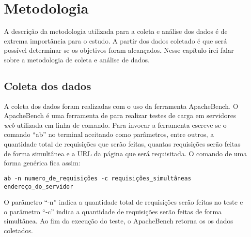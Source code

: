 \chapter{Metodologia}\label{cap:metodologia}
A descrição da metodologia utilizada para a coleta e análise dos dados é de 
extrema importância para o estudo. A partir dos dados coletado é que será 
possível determinar se os objetivos foram alcançados. Nesse capítulo irei falar 
sobre a metodologia de coleta e análise de dados.\\

\section{Coleta dos dados}
A coleta dos dados foram realizadas com o uso da ferramenta ApacheBench. O 
ApacheBench é uma ferramenta de para realizar testes de carga em servidores 
\textit{web} utilizada em linha de comando. Para invocar a ferramenta 
escreve-se o comando ``ab'' no terminal aceitando como parâmetros, entre 
outros, a quantidade total de requisições que serão feitas, quantas requisições 
serão feitas de forma simultânea e a URL da página que será requisitada. O 
comando de uma forma genérica fica assim:
\begin{verbatim}
ab -n numero_de_requisições -c requisições_simultâneas endereço_do_servidor
\end{verbatim}
O parâmetro ``-n'' indica a quantidade total de requisições serão feitas no 
teste e o parâmetro ``-c'' indica a quantidade de requisições serão feitas de 
forma simultânea. Ao fim da execução do teste, o ApacheBench retorna os os 
dados coletados.



